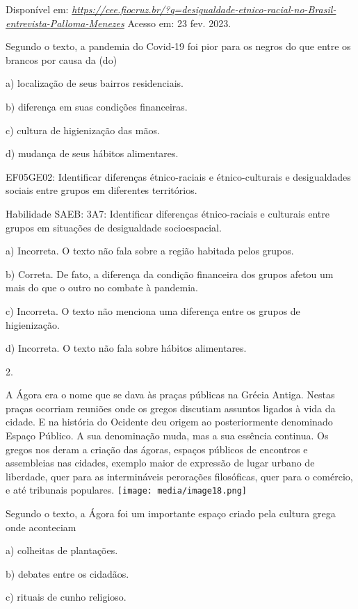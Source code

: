 Disponível em:
\href{https://cee.fiocruz.br/?q=desigualdade-etnico-racial-no-Brasil-entrevista-Palloma-Menezes}{\emph{https://cee.fiocruz.br/?q=desigualdade-etnico-racial-no-Brasil-entrevista-Palloma-Menezes}}
Acesso em: 23 fev. 2023.

Segundo o texto, a pandemia do Covid-19 foi pior para os negros do que
entre os brancos por causa da (do)

a) localização de seus bairros residenciais.

b) diferença em suas condições financeiras.

c) cultura de higienização das mãos.

d) mudança de seus hábitos alimentares.

EF05GE02: Identificar diferenças étnico-raciais e étnico-culturais e
desigualdades sociais entre grupos em diferentes territórios.

Habilidade SAEB: 3A7: Identificar diferenças étnico-raciais e culturais
entre grupos em situações de desigualdade socioespacial.

a) Incorreta. O texto não fala sobre a região habitada pelos grupos.

b) Correta. De fato, a diferença da condição financeira dos grupos
afetou um mais do que o outro no combate à pandemia.

c) Incorreta. O texto não menciona uma diferença entre os grupos de
higienização.

d) Incorreta. O texto não fala sobre hábitos alimentares.

2.

A Ágora era o nome que se dava às praças públicas na Grécia Antiga.
Nestas praças ocorriam reuniões onde os gregos discutiam assuntos
ligados à vida da cidade. E na história do Ocidente deu origem ao
posteriormente denominado Espaço Público. A sua denominação muda, mas a
sua essência continua. Os gregos nos deram a criação das ágoras, espaços
públicos de encontros e assembleias nas cidades, exemplo maior de
expressão de lugar urbano de liberdade, quer para as intermináveis
perorações filosóficas, quer para o comércio, e até tribunais populares.
\texttt{[image: media/image18.png]}

Segundo o texto, a Ágora foi um importante espaço criado pela cultura
grega onde aconteciam

a) colheitas de plantações.

b) debates entre os cidadãos.

c) rituais de cunho religioso.

